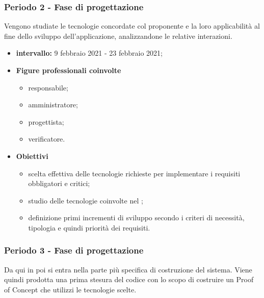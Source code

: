             \subsubsection{Periodo 2 - Fase di progettazione}
        
            Vengono studiate le tecnologie concordate col proponente e la loro applicabilità al fine dello sviluppo dell'applicazione, analizzandone le relative interazioni.
    
            \begin{itemize}
                \item \textbf{intervallo: }9 febbraio 2021 - 23 febbraio 2021;
            
            \item  \textbf{Figure professionali coinvolte}
                \begin{itemize}
                    \item responsabile;
                    \item amministratore;
                    \item progettista;
                    \item verificatore.
                \end{itemize}
    
                \item \textbf{Obiettivi}  
                            \begin{itemize}
                                \item scelta effettiva delle tecnologie richieste per implementare i requisiti obbligatori e critici;
                                \item studio delle tecnologie coinvolte nel ;
                                \item definizione primi incrementi di sviluppo secondo i criteri di necessità, tipologia e quindi priorità dei requisiti.
                            \end{itemize}
                \end{itemize}          
            
                \subsubsection{Periodo 3 - Fase di progettazione}
        
                Da qui in poi si entra nella parte più specifica di costruzione del sistema. Viene quindi prodotta una prima stesura del codice con lo scopo di costruire un Proof of Concept che utilizzi le tecnologie scelte.
        
